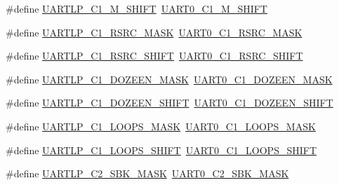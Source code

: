 \begin{DoxyCompactItemize}
\item 
\#define \hyperlink{group___backward___compatibility___symbols_ga7f948b34e2c66421e265c5d499e87db6}{U\+A\+R\+T\+L\+P\+\_\+\+C1\+\_\+\+M\+\_\+\+S\+H\+I\+FT}~\hyperlink{group___u_a_r_t0___register___masks_ga8d31680c97fb0821a0613ea8edc4982e}{U\+A\+R\+T0\+\_\+\+C1\+\_\+\+M\+\_\+\+S\+H\+I\+FT}
\item 
\#define \hyperlink{group___backward___compatibility___symbols_gaa53951441e58bf423d327892a23aa074}{U\+A\+R\+T\+L\+P\+\_\+\+C1\+\_\+\+R\+S\+R\+C\+\_\+\+M\+A\+SK}~\hyperlink{group___u_a_r_t0___register___masks_ga746b65fa3c8e5bb60aa81f98984ea2a3}{U\+A\+R\+T0\+\_\+\+C1\+\_\+\+R\+S\+R\+C\+\_\+\+M\+A\+SK}
\item 
\#define \hyperlink{group___backward___compatibility___symbols_ga4edf9821b67824b0fdd4931c27ce452d}{U\+A\+R\+T\+L\+P\+\_\+\+C1\+\_\+\+R\+S\+R\+C\+\_\+\+S\+H\+I\+FT}~\hyperlink{group___u_a_r_t0___register___masks_ga6c6190c9625b3cae766cb5e83ec51ee9}{U\+A\+R\+T0\+\_\+\+C1\+\_\+\+R\+S\+R\+C\+\_\+\+S\+H\+I\+FT}
\item 
\#define \hyperlink{group___backward___compatibility___symbols_gaa700bb55bfafb472644d0616a9488c97}{U\+A\+R\+T\+L\+P\+\_\+\+C1\+\_\+\+D\+O\+Z\+E\+E\+N\+\_\+\+M\+A\+SK}~\hyperlink{group___u_a_r_t0___register___masks_ga96d43575fd3133661535f83017c89298}{U\+A\+R\+T0\+\_\+\+C1\+\_\+\+D\+O\+Z\+E\+E\+N\+\_\+\+M\+A\+SK}
\item 
\#define \hyperlink{group___backward___compatibility___symbols_ga643a9b2d4426aa5f6cd371cf81b95404}{U\+A\+R\+T\+L\+P\+\_\+\+C1\+\_\+\+D\+O\+Z\+E\+E\+N\+\_\+\+S\+H\+I\+FT}~\hyperlink{group___u_a_r_t0___register___masks_ga5d6e4f4ab4b49ca54f600ff72198acbb}{U\+A\+R\+T0\+\_\+\+C1\+\_\+\+D\+O\+Z\+E\+E\+N\+\_\+\+S\+H\+I\+FT}
\item 
\#define \hyperlink{group___backward___compatibility___symbols_gabf6750c9bbd5add41b650fcb0e2f3cc9}{U\+A\+R\+T\+L\+P\+\_\+\+C1\+\_\+\+L\+O\+O\+P\+S\+\_\+\+M\+A\+SK}~\hyperlink{group___u_a_r_t0___register___masks_ga652e29ee005896dc658da4a9f4b45648}{U\+A\+R\+T0\+\_\+\+C1\+\_\+\+L\+O\+O\+P\+S\+\_\+\+M\+A\+SK}
\item 
\#define \hyperlink{group___backward___compatibility___symbols_ga15b68685a3a0931d93b4848953390d10}{U\+A\+R\+T\+L\+P\+\_\+\+C1\+\_\+\+L\+O\+O\+P\+S\+\_\+\+S\+H\+I\+FT}~\hyperlink{group___u_a_r_t0___register___masks_ga314b9a28f9ddde7c21b9c62b8bbab5a4}{U\+A\+R\+T0\+\_\+\+C1\+\_\+\+L\+O\+O\+P\+S\+\_\+\+S\+H\+I\+FT}
\item 
\#define \hyperlink{group___backward___compatibility___symbols_ga6eae1bd3ccd0ddc022e4b25e685cdcd5}{U\+A\+R\+T\+L\+P\+\_\+\+C2\+\_\+\+S\+B\+K\+\_\+\+M\+A\+SK}~\hyperlink{group___u_a_r_t0___register___masks_ga13e4f48ae7752289f4d05530569f86a2}{U\+A\+R\+T0\+\_\+\+C2\+\_\+\+S\+B\+K\+\_\+\+M\+A\+SK}

\end{DoxyCompactItemize}
